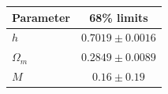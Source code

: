\begin{tabular} { l  c}

 Parameter &  68\% limits\\
\hline
{\boldmath$h              $} & $0.7019\pm 0.0016          $\\

{\boldmath$Ω_m            $} & $0.2849\pm 0.0089          $\\

{\boldmath$M              $} & $0.16\pm 0.19              $\\
\hline
\end{tabular}